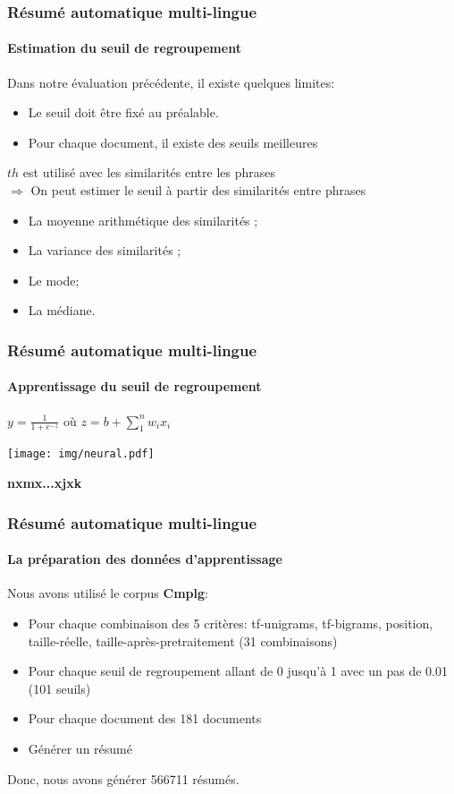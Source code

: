 \documentclass{beamer}
\begin{document}
\begin{frame}
\frametitle{Résumé automatique multi-lingue}
\framesubtitle{Estimation du seuil de regroupement}

Dans notre évaluation précédente, il existe quelques limites:
\begin{itemize}
\item Le seuil doit être fixé au préalable.
\item Pour chaque document, il existe des seuils meilleures
\end{itemize}

$ th $ est utilisé avec les similarités entre les phrases\\
$ \Rightarrow  $ On peut estimer le seuil à partir des similarités entre phrases
{\scriptsize
\begin{itemize}
\item La moyenne arithmétique des similarités ;
\item La variance des similarités ;
\item Le mode;
\item La médiane.
\end{itemize}
}
\end{frame}

\begin{frame}
\frametitle{Résumé automatique multi-lingue}
\framesubtitle{Apprentissage du seuil de regroupement}
$ y = \frac{1}{1 + e^{-z}}  $ où $ z = b + \sum_{1}^{n} w_i x_i $
\begin{center}
\texttt{[image: img/neural.pdf]}
\end{center}
\textbf{nxmx...xjxk}
\end{frame}

\begin{frame}
\frametitle{Résumé automatique multi-lingue}
\framesubtitle{La préparation des données d'apprentissage}

Nous avons utilisé le corpus \textbf{Cmplg}:
\begin{itemize}
\item Pour chaque combinaison des 5 critères: tf-unigrams, tf-bigrams, position, taille-réelle, taille-après-pretraitement (31 combinaisons)
\item Pour chaque seuil de regroupement allant de 0 jusqu'à 1 avec un pas de 0.01 (101 seuils)
\item Pour chaque document des 181 documents
\item Générer un résumé
\end{itemize}
Donc, nous avons générer 566711 résumés. 

\end{frame}
\end{document}
